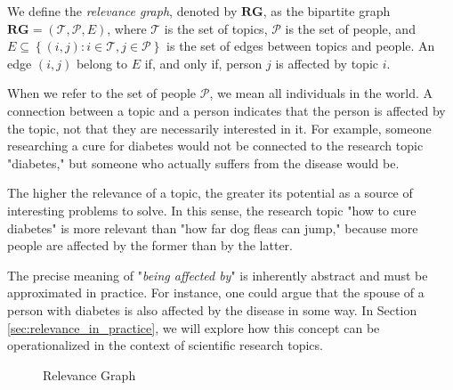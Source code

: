 \begin{definition}
\label{def:relevance-graph}
We define the \emph{relevance graph}, denoted by $\mathbf{RG}$, as the bipartite graph $\mathbf{RG} = (\mathcal{T}, \mathcal{P}, E)$, where $\mathcal{T}$ is the set of topics, $\mathcal{P}$ is the set of people, and $E\subseteq\left\{ \left(i,j\right):i\in \mathcal{T},j\in \mathcal{P} \right\}$ is the set of edges between topics and people. An edge $(i, j)$ belong to $E$ if, and only if, person $j$ is affected by topic $i$.
\end{definition}

When we refer to the set of people $\mathcal{P}$, we mean all individuals in the world. A connection between a topic and a person indicates that the person is affected by the topic, not that they are necessarily interested in it. For example, someone researching a cure for diabetes would not be connected to the research topic "diabetes," but someone who actually suffers from the disease would be.

The higher the relevance of a topic, the greater its potential as a source of interesting problems to solve. In this sense, the research topic "how to cure diabetes" is more relevant than "how far dog fleas can jump," because more people are affected by the former than by the latter.

The precise meaning of "\emph{being affected by}" is inherently abstract and must be approximated in practice. For instance, one could argue that the spouse of a person with diabetes is also affected by the disease in some way. In Section \ref{sec:relevance_in_practice}, we will explore how this concept can be operationalized in the context of scientific research topics.


\begin{figure}[t]
\centering
{}
\caption{\label{fig:Relevance-Graph}Relevance Graph}
\end{figure}

